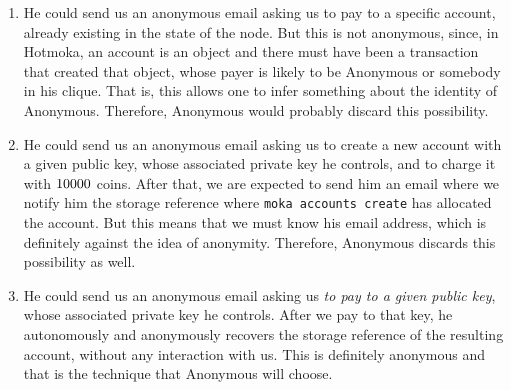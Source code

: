 \begin{enumerate}
\item\label{enum:anonymous_1} He could send us an anonymous email asking us to pay to a specific account, already existing
   in the state of the node. But this is not anonymous, since, in Hotmoka, an account is an object
   and there must have been a transaction that created that object, whose payer is likely to be
   Anonymous or somebody in his clique. That is, this allows one to infer something
   about the identity of Anonymous. Therefore, Anonymous would probably discard this possibility.
 \item\label{enum:anonymous_2} He could send us an anonymous email asking
   us to create a new account with a given public key, whose associated
   private key he controls, and to charge it with $10000{}$ coins.
   After that, we are expected
   to send him an email where we notify him the storage reference where
   \texttt{moka accounts create} has allocated the account. But this means that we must know his
   email address, which is definitely against the idea of anonymity. Therefore,
   Anonymous discards this possibility as well.
\item He could send us an anonymous email asking us \emph{to pay to a given public key}, whose
   associated private key he controls.
   After we pay to that key, he autonomously and anonymously recovers the storage reference of the
   resulting account, without any interaction with us. This is definitely anonymous and that is
   the technique that Anonymous will choose.
\end{enumerate}

